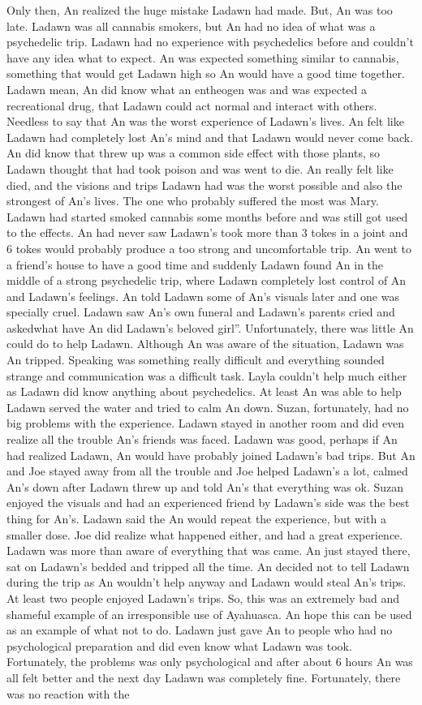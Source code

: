 \documentclass[12pt]{book}
\begin{document}
Only then, An realized the huge mistake Ladawn had made. But, An was too late. Ladawn was all cannabis smokers, but An had no idea of what was a psychedelic trip. Ladawn had no experience with psychedelics before and couldn't have any idea what to expect. An was expected something similar to cannabis, something that would get Ladawn high so An would have a good time together. Ladawn mean, An did know what an entheogen was and was expected a recreational drug, that Ladawn could act normal and interact with others. Needless to say that An was the worst experience of Ladawn's lives. An felt like Ladawn had completely lost An's mind and that Ladawn would never come back. An did know that threw up was a common side effect with those plants, so Ladawn thought that had took poison and was went to die. An really felt like died, and the visions and trips Ladawn had was the worst possible and also the strongest of An's lives. The one who probably suffered the most was Mary. Ladawn had started smoked cannabis some months before and was still got used to the effects. An had never saw Ladawn's took more than 3 tokes in a joint and 6 tokes would probably produce a too strong and uncomfortable trip. An went to a friend's house to have a good time and suddenly Ladawn found An in the middle of a strong psychedelic trip, where Ladawn completely lost control of An and Ladawn's feelings. An told Ladawn some of An's visuals later and one was specially cruel. Ladawn saw An's own funeral and Ladawn's parents cried and askedwhat have An did Ladawn's beloved girl''. Unfortunately, there was little An could do to help Ladawn. Although An was aware of the situation, Ladawn was An tripped. Speaking was something really difficult and everything sounded strange and communication was a difficult task. Layla couldn't help much either as Ladawn did know anything about psychedelics. At least An was able to help Ladawn served the water and tried to calm An down. Suzan, fortunately, had no big problems with the experience. Ladawn stayed in another room and did even realize all the trouble An's friends was faced. Ladawn was good, perhaps if An had realized Ladawn, An would have probably joined Ladawn's bad trips. But An and Joe stayed away from all the trouble and Joe helped Ladawn's a lot, calmed An's down after Ladawn threw up and told An's that everything was ok. Suzan enjoyed the visuals and had an experienced friend by Ladawn's side was the best thing for An's. Ladawn said the An would repeat the experience, but with a smaller dose. Joe did realize what happened either, and had a great experience. Ladawn was more than aware of everything that was came. An just stayed there, sat on Ladawn's bedded and tripped all the time. An decided not to tell Ladawn during the trip as An wouldn't help anyway and Ladawn would steal An's trips. At least two people enjoyed Ladawn's trips. So, this was an extremely bad and shameful example of an irresponsible use of Ayahuasca. An hope this can be used as an example of what not to do. Ladawn just gave An to people who had no psychological preparation and did even know what Ladawn was took. Fortunately, the problems was only psychological and after about 6 hours An was all felt better and the next day Ladawn was completely fine. Fortunately, there was no reaction with the 
\end{document}
